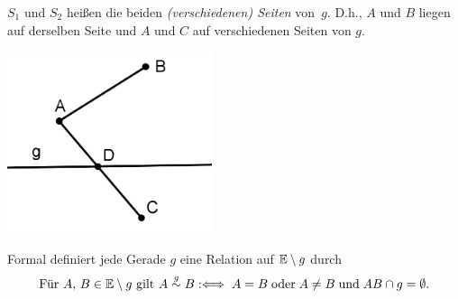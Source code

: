 $S_1$ und $S_2$ hei{\ss}en die beiden \emph{(verschiedenen) Seiten}
von~$g$. D.h., $A$ und $B$ liegen auf derselben Seite und $A$ und $C$ auf
    verschiedenen Seiten von $g$.


\centerline{\includegraphics[width=6cm]{BILDER/1-1-06a-Seiten.png}}


Formal definiert jede Gerade $g$ eine Relation auf
$\mathbb E\setminus g$ durch
\[
\mbox{Für } A,\,B\in\mathbb E\setminus g
\mbox{ gilt } A\stackrel{g}{\sim} B
:\Longleftrightarrow\;A=B\;\mbox{oder}\;A\neq B\;\mbox{und}\;
    {AB}\cap g=\emptyset.
\]


